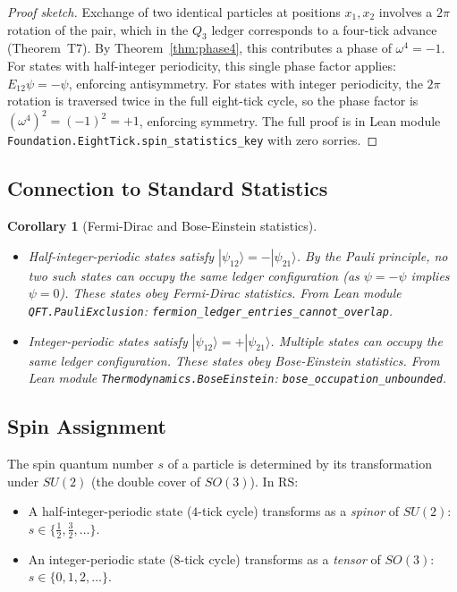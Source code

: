 \documentclass[12pt,a4paper]{article}
\newtheorem{corollary}[theorem]{Corollary}
\theoremstyle{definition}
\theoremstyle{remark}
\begin{document}
\begin{proof}[Proof sketch]
Exchange of two identical particles at positions $x_1, x_2$ involves
a $2\pi$ rotation of the pair, which in the $Q_3$ ledger corresponds to a
four-tick advance (Theorem~T7).  By Theorem~\ref{thm:phase4}, this
contributes a phase of $\omega^4 = -1$.  For states with half-integer
periodicity, this single phase factor applies: $E_{12}\psi = -\psi$,
enforcing antisymmetry.  For states with integer periodicity, the
$2\pi$ rotation is traversed twice in the full eight-tick cycle, so
the phase factor is $(\omega^4)^2 = (-1)^2 = +1$, enforcing symmetry.
The full proof is in Lean module
\texttt{Foundation.EightTick.spin\_statistics\_key} with zero sorries.
\end{proof}

\subsection{Connection to Standard Statistics}

\begin{corollary}[Fermi-Dirac and Bose-Einstein statistics]
\label{cor:stats}
\begin{itemize}
  \item Half-integer-periodic states satisfy $|\psi_{12}\rangle =
        -|\psi_{21}\rangle$.  By the Pauli principle, no two such states
        can occupy the same ledger configuration (as $\psi = -\psi$
        implies $\psi = 0$).  These states obey Fermi-Dirac statistics.
        From Lean module \texttt{QFT.PauliExclusion}:
        \texttt{fermion\_ledger\_entries\_cannot\_overlap}.
  \item Integer-periodic states satisfy $|\psi_{12}\rangle =
        +|\psi_{21}\rangle$.  Multiple states can occupy the same ledger
        configuration.  These states obey Bose-Einstein statistics.
        From Lean module \texttt{Thermodynamics.BoseEinstein}:
        \texttt{bose\_occupation\_unbounded}.
\end{itemize}
\end{corollary}

\subsection{Spin Assignment}

The spin quantum number $s$ of a particle is determined by its
transformation under $SU(2)$ (the double cover of $SO(3)$).  In RS:
\begin{itemize}
  \item A half-integer-periodic state ($4$-tick cycle) transforms
        as a \emph{spinor} of $SU(2)$: $s \in \{\tfrac{1}{2}, \tfrac{3}{2}, \ldots\}$.
  \item An integer-periodic state ($8$-tick cycle) transforms as a
        \emph{tensor} of $SO(3)$: $s \in \{0, 1, 2, \ldots\}$.
\end{itemize}
\end{document}
